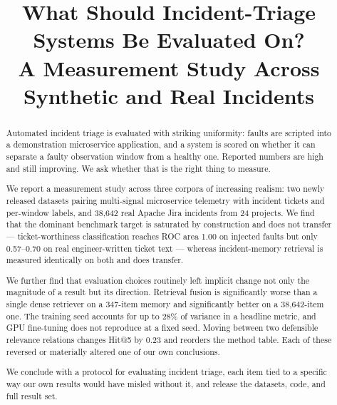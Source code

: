 \documentclass[conference]{IEEEtran}
\begin{document}
\title{What Should Incident-Triage Systems Be Evaluated On?\\
\large A Measurement Study Across Synthetic and Real Incidents}


\maketitle

\begin{abstract}
Automated incident triage is evaluated with striking uniformity: faults are
scripted into a demonstration microservice application, and a system is scored
on whether it can separate a faulty observation window from a healthy one.
Reported numbers are high and still improving. We ask whether that is the right
thing to measure.

We report a measurement study across three corpora of increasing realism: two
newly released datasets pairing multi-signal microservice telemetry with
incident tickets and per-window labels, and 38,642 real Apache Jira incidents
from 24 projects. We find that the dominant benchmark target is saturated by
construction and does not transfer --- ticket-worthiness classification reaches
ROC area 1.00 on injected faults but only 0.57--0.70 on real engineer-written
ticket text --- whereas incident-memory retrieval is measured identically on
both and does transfer.

We further find that evaluation choices routinely left implicit change not only
the magnitude of a result but its direction. Retrieval fusion is significantly
worse than a single dense retriever on a 347-item memory and significantly
better on a 38,642-item one. The training seed accounts for up to 28\% of
variance in a headline metric, and GPU fine-tuning does not reproduce at a fixed
seed. Moving between two defensible relevance relations changes Hit@5 by 0.23
and reorders the method table. Each of these reversed or materially altered one
of our own conclusions.

We conclude with a protocol for evaluating incident triage, each item tied to a
specific way our own results would have misled without it, and release the
datasets, code, and full result set.
\end{abstract}
\end{document}
